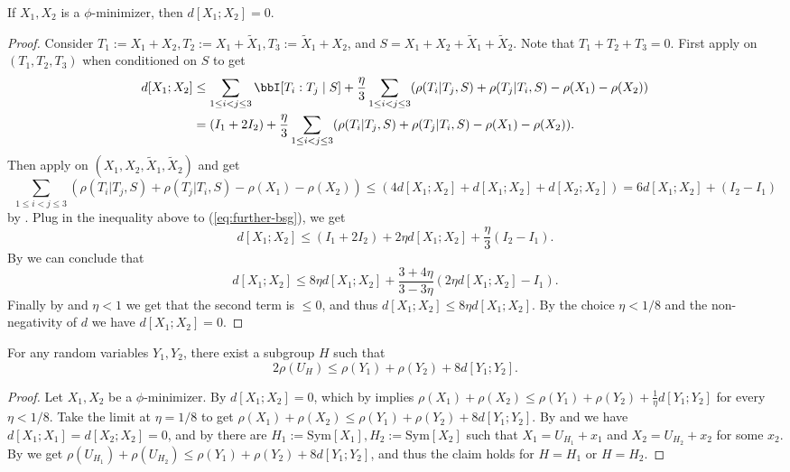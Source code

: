 \begin{proposition}\label{phi-minimizer-zero-distance}\leanok  If $X_1,X_2$ is a $\phi$-minimizer, then $d[X_1;X_2] = 0$.
\end{proposition}

\begin{proof}
Consider $T_1:=X_1+X_2,T_2:=X_1+\tilde X_1, T_3:=\tilde X_1 + X_2$, and $S=X_1+X_2+\tilde X_1 + \tilde X_2$. Note that $T_1+T_2+T_3=0$.
First apply  on $(T_1,T_2,T_3)$ when conditioned on $S$ to get
\begin{align}  \label{eq:further-bsg}
d[X_1;X_2] &\leq  \sum_{1 \leq i<j \leq 3} \bbI[T_i:T_j\mid S] + \frac{\eta}{3}   \sum_{1 \leq i<j \leq 3} (\rho(T_i|T_j,S) + \rho(T_j|T_i,S) -\rho(X_1)-\rho(X_2))\nonumber\\
&= (I_1+2I_2) + \frac{\eta}{3}   \sum_{1 \leq i<j \leq 3} (\rho(T_i|T_j,S) + \rho(T_j|T_i,S) -\rho(X_1)-\rho(X_2)).
\end{align}
Then apply  on $(X_1,X_2,\tilde X_1,\tilde X_2)$ and get
$$\sum_{1 \leq i<j \leq 3} (\rho(T_i|T_j,S) + \rho(T_j|T_i,S) -  \rho(X_1)-\rho(X_2))\le (4d[X_1;X_2]+d[X_1;X_2]+d[X_2;X_2])= 6 d[X_1;X_2]+(I_2-I_1)$$
by . Plug in the inequality above to (\ref{eq:further-bsg}), we get
$$d[X_1;X_2] \le (I_1+2I_2)+2\eta d[X_1;X_2]+\frac{\eta}{3}(I_2-I_1).$$
By  we can conclude that
$$d[X_1;X_2] \le 8\eta d[X_1;X_2]+\frac{3+4\eta}{3-3\eta} (2\eta d[X_1;X_2]-I_1).$$
Finally by  and $\eta<1$ we get that the second term is $\le 0$, and thus $d[X_1;X_2] \le 8\eta d[X_1;X_2]$. By the choice $\eta<1/8$ and the non-negativity of $d$ we have $d[X_1;X_2]=0$.
\end{proof}


\begin{proposition} \label{pfr-rho}\leanok For any random variables $Y_1,Y_2$, there exist a subgroup $H$ such that
  $$ 2\rho(U_H) \leq \rho(Y_1) + \rho(Y_2) + 8 d[Y_1;Y_2].$$
\end{proposition}

\begin{proof}
Let $X_1,X_2$ be a $\phi$-minimizer. By  $d[X_1;X_2]=0$, which by  implies $\rho(X_1)+\rho(X_2)\le \rho(Y_1) + \rho(Y_2) + \frac{1}{\eta} d[Y_1;Y_2]$ for every $\eta<1/8$. Take the limit at $\eta=1/8$ to get $\rho(X_1)+\rho(X_2)\le \rho(Y_1) + \rho(Y_2) + 8 d[Y_1;Y_2]$.
By  and  we have $d[X_1;X_1]=d[X_2;X_2]=0$, and by  there are $H_1:=\mathrm{Sym}[X_1],H_2:=\mathrm{Sym}[X_2]$ such that $X_1=U_{H_1}+x_1$ and $X_2=U_{H_2}+x_2$ for some $x_2$.
By  we get $\rho(U_{H_1})+\rho(U_{H_2})\le \rho(Y_1) + \rho(Y_2) + 8 d[Y_1;Y_2]$, and thus the claim holds for $H=H_1$ or $H=H_2$.
\end{proof}

